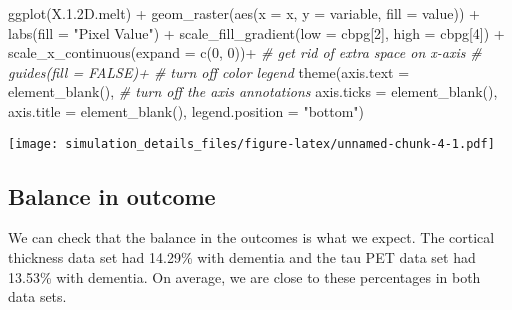 \documentclass[
]{article}
\newenvironment{Shaded}{\begin{snugshade}}{\end{snugshade}}
\newcommand{\AttributeTok}[1]{\textcolor[rgb]{0.77,0.63,0.00}{#1}}
\newcommand{\CommentTok}[1]{\textcolor[rgb]{0.56,0.35,0.01}{\textit{#1}}}
\newcommand{\DecValTok}[1]{\textcolor[rgb]{0.00,0.00,0.81}{#1}}
\newcommand{\FloatTok}[1]{\textcolor[rgb]{0.00,0.00,0.81}{#1}}
\newcommand{\FunctionTok}[1]{\textcolor[rgb]{0.00,0.00,0.00}{#1}}
\newcommand{\NormalTok}[1]{#1}
\newcommand{\SpecialCharTok}[1]{\textcolor[rgb]{0.00,0.00,0.00}{#1}}
\newcommand{\StringTok}[1]{\textcolor[rgb]{0.31,0.60,0.02}{#1}}
\begin{document}
\begin{Shaded}
\begin{Highlighting}[]
\FunctionTok{ggplot}\NormalTok{(X.}\FloatTok{1.2}\NormalTok{D.melt) }\SpecialCharTok{+} 
  \FunctionTok{geom\_raster}\NormalTok{(}\FunctionTok{aes}\NormalTok{(}\AttributeTok{x =}\NormalTok{ x, }\AttributeTok{y =}\NormalTok{ variable, }\AttributeTok{fill =}\NormalTok{ value)) }\SpecialCharTok{+}
  \FunctionTok{labs}\NormalTok{(}\AttributeTok{fill =} \StringTok{"Pixel Value"}\NormalTok{) }\SpecialCharTok{+}
  \FunctionTok{scale\_fill\_gradient}\NormalTok{(}\AttributeTok{low =}\NormalTok{ cbpg[}\DecValTok{2}\NormalTok{], }\AttributeTok{high =}\NormalTok{ cbpg[}\DecValTok{4}\NormalTok{]) }\SpecialCharTok{+} 
  \FunctionTok{scale\_x\_continuous}\NormalTok{(}\AttributeTok{expand =} \FunctionTok{c}\NormalTok{(}\DecValTok{0}\NormalTok{, }\DecValTok{0}\NormalTok{))}\SpecialCharTok{+}   \CommentTok{\# get rid of extra space on x{-}axis}
  \CommentTok{\# guides(fill = FALSE)+                  \# turn off color legend}
  \FunctionTok{theme}\NormalTok{(}\AttributeTok{axis.text =} \FunctionTok{element\_blank}\NormalTok{(),     }\CommentTok{\# turn off the axis annotations}
        \AttributeTok{axis.ticks =} \FunctionTok{element\_blank}\NormalTok{(),}
        \AttributeTok{axis.title =} \FunctionTok{element\_blank}\NormalTok{(),}
        \AttributeTok{legend.position =} \StringTok{"bottom"}\NormalTok{)}
\end{Highlighting}
\end{Shaded}

\texttt{[image: simulation\_details\_files/figure-latex/unnamed-chunk-4-1.pdf]}

\hypertarget{balance-in-outcome}{%
\subsection{Balance in outcome}\label{balance-in-outcome}}

We can check that the balance in the outcomes is what we expect. The
cortical thickness data set had 14.29\% with dementia and the tau PET
data set had 13.53\% with dementia. On average, we are close to these
percentages in both data sets.
\end{document}

